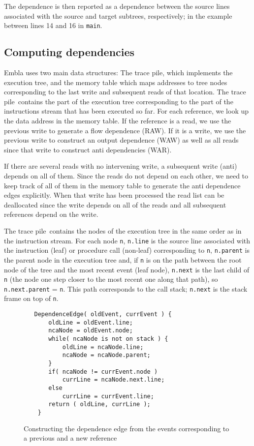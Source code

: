 \documentclass{acm_proc_article-sp}
\begin{document}
The dependence is then reported as a dependence between the source lines
associated with the source and target subtrees, respectively; in the example
between lines 14 and 16 in {\tt main}.

\newcommand{\tracepile}{trace pile}

\subsection{Computing dependencies}

Embla uses two main data structures: The \tracepile, which implements 
the execution tree, and the memory table which maps addresses to tree
nodes corresponding to the last write and subsequent reads of that
location. The \tracepile\ contains the part of the execution tree
corresponding to the part of the instructions stream that has been
executed so far.
For each reference, we look up the data address in the memory 
table. If the reference is a read, we use the previous write to generate
a flow dependence (RAW). If it is a write, we use the previous write to 
construct an output dependence (WAW) as well as all reads since that 
write to construct anti dependencies (WAR).

If there are several reads with no intervening write, a subsequent write
(anti) depends on all of them. Since the reads do not depend on each other,
we need to keep track of all of them in the memory table to generate the
anti dependence edges explicitly. When that write has been processed 
the read list can be deallocated since
the write depends on all of the reads and
all subsequent references depend on the write.

The \tracepile\ contains the nodes of the execution tree in the same order
as in the instruction stream. For each node {\tt n}, {\tt n.line} is the 
source line associated with the instruction (leaf) or procedure call
(non-leaf) 
corresponding to {\tt n}, {\tt n.parent} is the parent node in the execution tree 
and, if {\tt n} is 
on the path between the root node of the tree and the most recent 
event (leaf node), {\tt n.next} is the last child of {\tt n} (the node one step 
closer to the most recent one
along that path), so {\tt n.next.parent} = {\tt n}. This
path corresponds to the call stack; {\tt n.next} is the stack frame on
top of {\tt n}.

\begin{figure}
\small
\hrulefill
\begin{verbatim}
   DependenceEdge( oldEvent, currEvent ) {
       oldLine = oldEvent.line;
       ncaNode = oldEvent.node;
       while( ncaNode is not on stack ) {
           oldLine = ncaNode.line;
           ncaNode = ncaNode.parent;
       }
       if( ncaNode != currEvent.node )
           currLine = ncaNode.next.line;
       else
           currLine = currEvent.line;
       return ( oldLine, currLine );
    }
\end{verbatim}
\hrulefill
\caption{Constructing the dependence edge from the events corresponding
to a previous and a new reference}
\label{fdepedge}
\end{figure}    
\end{document}
